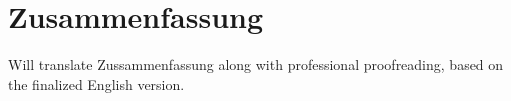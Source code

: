 \section*{Zusammenfassung} 
Will translate Zussammenfassung along with professional proofreading, based on the finalized English version.
